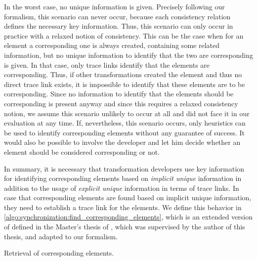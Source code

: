 In the worst case, no unique information is given.
Precisely following our formalism, this scenario can never occur, because each consistency relation defines the necessary key information.
Thus, this scenario can only occur in practice with a relaxed notion of consistency.
This can be the case when for an element a corresponding one is always created, containing some related information, but no unique information to identify that the two are corresponding is given.
In that case, only trace links identify that the elements are corresponding.
Thus, if other transformations created the element and thus no direct trace link exists, it is impossible to identify that these elements are to be corresponding.
Since no information to identify that the elements should be corresponding is present anyway and since this requires a relaxed consistency notion, we assume this scenario unlikely to occur at all and did not face it in our evaluation at any time.
If, nevertheless, this scenario occurs, only heuristics can be used to identify corresponding elements without any guarantee of success.
It would also be possible to involve the developer and let him decide whether an element should be considered corresponding or not.

In summary, it is necessary that transformation developers use key information for identifying corresponding elements based on \emph{implicit unique} information in addition to the usage of \emph{explicit unique} information in terms of trace links. %
In case that corresponding elements are found based on implicit unique information, they need to establish a trace link for the elements.
We define this behavior in \autoref{algo:synchronization:find_corresponding_elements}, which is an extended version of \cite[Algorithm 1]{saglam2020ma} defined in the Master's thesis of \citeauthor{saglam2020ma}, which was supervised by the author of this thesis, and adapted to our formalism.

\begin{algorithm}
    
    \caption[Retrieval of corresponding elements]{Retrieval of corresponding elements.}
    \label{algo:synchronization:find_corresponding_elements}
\end{algorithm}

